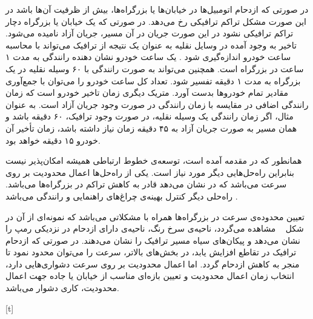 

در صورتی که ازدحام اتومبیل‌ها در خیابان‌ها یا بزرگراه‌ها، بیش از ظرفیت آن‌ها باشد در این صورت مشکل تراکم ترافیکی رخ می‌دهد. در صورتی که یک خیابان یا بزرگراه دچار تراکم ترافیکی نشود در این صورت جریان در آن مسیر، جریان آزاد نامیده می‌شود.
تاخیر به وجود آمده در وسایل نقلیه به عنوان یک نتیجه از ترافیک می‌تواند با محاسبه ساعت خودرو اندازه‌گیری شود \cite{Jacob2006}. یک ساعت خودرو نشان دهنده رانندگی به مدت ۱ ساعت در بزرگراه است. همچنین می‌تواند به صورت رانندگی با ۶۰ وسیله نقلیه در یک بزرگراه به مدت ۱ دقیقه تفسیر شود. تعداد کل ساعت خودرو را می‌توان با جمع‌آوری مقادیر تمام خودرو‌ها بدست آورد. متریک دیگری زمان تاخیر خودرو است که زمان رانندگی اضافی در مقایسه با زمان رانندگی در صورت وجود جریان آزاد است. به عنوان مثال، اگر زمان رانندگی یک وسیله نقلیه، در صورت وجود ترافیک، ۶۰ دقیقه باشد و همان مسیر به صورت جریان آزاد به ۴۵ دقیقه زمان نیاز داشته باشد، زمان تأخیر آن خودرو ۱۵ دقیقه خواهد بود.

همانطور که در مقدمه آمده است، توسعه‌ی خطوط ارتباطی همیشه امکان‌پذیر نیست  بنابراین راه‌حل‌هایی دیگر مورد نیاز است. یکی از راه‌حل‌ها اعمال محدودیت بر روی سرعت می‌باشد که در \cite{Jacob2006} نشان می‌دهد قادر به کاهش تراکم در بزرگراه‌ها می‌باشد.
راه‌حلی دیگر کنترل بهینه‌ی چراغ‌های راهنمایی و رانندگی می‌باشد \cite{Wiering2000, Touhbi2017}.

تعیین محدوده‌ی سرعت در بزرگراه‌ها همراه با مشکلاتی می‌باشد که نمونه‌ای از آن در شکل ~ مشاهده می‌گردد، ناحیه‌ی سرخ رنگ، ناحیه‌ی دارای ازدحام در نزدیکی رمپ را نشان می‌دهد و پیکان‌های سیاه مسیر ترافیک را نشان می‌دهند. در صورتی که ازدحام ترافیک در تقاطع افزایش یابد، در بخش‌های بالاتر، سرعت را می‌توان محدود نمود تا منجر به کاهش ازدحام گردد.
اما اعمال محدودیت بر روی سرعت دشواری‌هایی دارد، انتخاب زمان اعمال محدودیت و تعیین بازه‌ای مناسب از خیابان یا جاده جهت اعمال محدودیت، کاری دشوار می‌باشد. 

[t]






